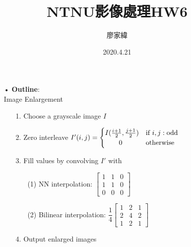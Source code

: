 \documentclass[12pt,a4paper]{article}
\title{NTNU影像處理HW6}
\author{廖家緯}
\date{2020.4.21}
\begin{document}
\maketitle
\fontsize{12pt}{20pt}\selectfont
\setlength{\baselineskip}{20pt}

\pagestyle{fancy}
\lhead{}
\chead{}
\rhead{}
\lfoot{}
\cfoot{\thepage}
\rfoot{}
\renewcommand{\headrulewidth}{0pt} %
\renewcommand{\footrulewidth}{0pt} %




\begin{enumerate}
\item[•]{\bf Outline}:\\
Image Enlargement
\begin{enumerate}
\item[1.]Choose a grayscale image $I$\\
\item[2.]Zero interleave
$I'(i, j) = \begin{cases}
I(\frac{i+1}{2}, \frac{j+1}{2})
& \text{if }i, j:\text{odd}\\
\hspace*{2em}0 & \text{otherwise}
\end{cases}$\\
\item[3.]
Fill values by convolving $I'$ with\\
\begin{enumerate}
\item[(1)]NN interpolation:
$\left[\begin{array}{ccc}
1 & 1 & 0\\
1 & 1 & 0\\
0 & 0 & 0
\end{array}\right]$\\

\item[(2)]Bilinear interpolation:
$\dfrac{1}{4}\left[\begin{array}{ccc}
1 & 2 & 1\\
2 & 4 & 2\\
1 & 2 & 1
\end{array}\right]$\\
\end{enumerate}

\item[4.]Output enlarged images\\
\end{enumerate}


\end{enumerate}
\end{document}
